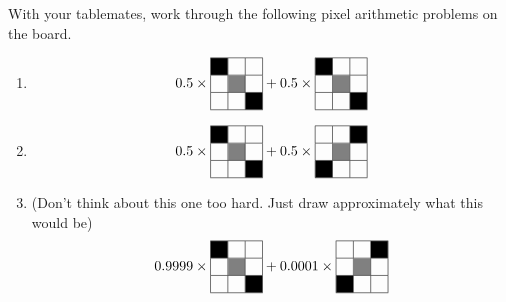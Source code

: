 \begin{prob}
With your tablemates, work through the following pixel arithmetic problems on the board.
\begin{enumerate}
\item

\begin{align}
0.5 \times \begin{tabular}{|c|c|c|}
\hline
\cellcolor{black}& & \\
\hline
& \cellcolor{gray} & \\
\hline
& & \cellcolor{black} \\
\hline
\end{tabular} + 0.5 \times \begin{tabular}{|c|c|c|}
\hline
\cellcolor{black} & & \\
\hline
& \cellcolor{gray} & \\
\hline
& & \cellcolor{black} \\
\hline
\end{tabular} \nonumber
\end{align}

\item \begin{align}
0.5 \times \begin{tabular}{|c|c|c|}
\hline
\cellcolor{black}& & \\
\hline
& \cellcolor{gray} & \\
\hline
& & \cellcolor{black} \\
\hline
\end{tabular} + 0.5 \times \begin{tabular}{|c|c|c|}
\hline
 & &\cellcolor{black} \\
\hline
& \cellcolor{gray} & \\
\hline
 \cellcolor{black} & & \\
\hline
\end{tabular}\nonumber
\end{align}

\item (Don't think about this one too hard.  Just draw approximately what this would be) \begin{align}
0.9999 \times \begin{tabular}{|c|c|c|}
\hline
\cellcolor{black}& & \\
\hline
& \cellcolor{gray} & \\
\hline
& & \cellcolor{black} \\
\hline
\end{tabular} + 0.0001 \times \begin{tabular}{|c|c|c|}
\hline
 & &\cellcolor{black} \\
\hline
& \cellcolor{gray} & \\
\hline
 \cellcolor{black} & & \\
\hline
\end{tabular}\nonumber
\end{align}
\end{enumerate}
\end{prob}

